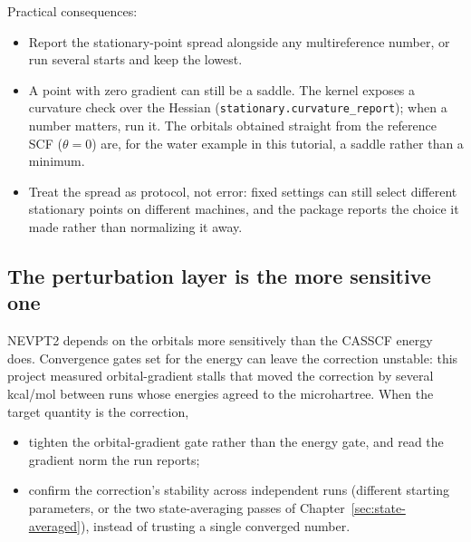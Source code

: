 Practical consequences:

\begin{itemize}
  \item Report the stationary-point spread alongside any
    multireference number, or run several starts and keep the lowest.
  \item A point with zero gradient can still be a saddle.  The kernel
    exposes a curvature check over the Hessian
    (\texttt{stationary.curvature\_report}); when a number matters,
    run it.  The orbitals obtained straight from the reference SCF
    ($\theta = 0$) are, for the water example in this tutorial, a
    saddle rather than a minimum.
  \item Treat the spread as protocol, not error: fixed settings can
    still select different stationary points on different machines,
    and the package reports the choice it made rather than
    normalizing it away.
\end{itemize}

\subsection{The perturbation layer is the more sensitive one}

NEVPT2 depends on the orbitals more sensitively than the CASSCF energy
does.  Convergence gates set for the energy can leave the correction
unstable: this project measured orbital-gradient stalls that moved the
correction by several kcal/mol between runs whose energies agreed to
the microhartree.  When the target quantity is the correction,

\begin{itemize}
  \item tighten the orbital-gradient gate rather than the energy
    gate, and read the gradient norm the run reports;
  \item confirm the correction's stability across independent runs
    (different starting parameters, or the two state-averaging passes
    of Chapter~\ref{sec:state-averaged}), instead of trusting a
    single converged number.
\end{itemize}
